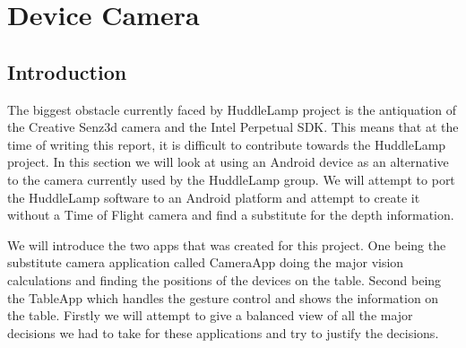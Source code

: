 \chapter{Device Camera} 
 
\label{ch:devcamera}
\section{Introduction}
 
The biggest obstacle currently faced by HuddleLamp project is the antiquation of the Creative Senz3d camera and the Intel Perpetual SDK\cite{obsolete_perpetual_sdk}. This means that at the time of writing this report, it is difficult to contribute towards the HuddleLamp project. In this section we will look at using an Android device as an alternative to the camera currently used by the HuddleLamp group. We will attempt to port the HuddleLamp software to an Android platform and attempt to create it without a Time of Flight camera and find a substitute for the depth information.

We will introduce the two apps that was created for this project. One being the substitute camera application called CameraApp doing the major vision calculations and finding the positions of the devices on the table. Second being the TableApp which handles the gesture control and shows the information on the table. Firstly we will attempt to give a balanced view of all the major decisions we had to take for these applications and try to justify the decisions.